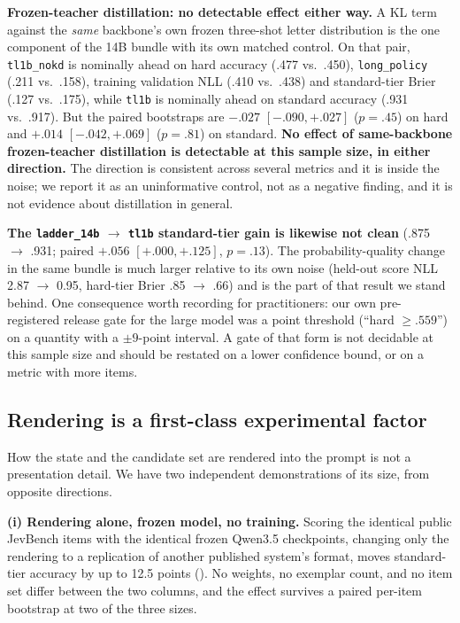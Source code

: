\textbf{Frozen-teacher distillation: no detectable effect either way.} A KL term against the
\emph{same} backbone's own frozen three-shot letter distribution is the one component of the 14B bundle
with its own matched control. On that pair, \texttt{tl1b\_nokd} is nominally ahead on hard accuracy
(.477 vs.\ .450), \texttt{long\_policy} (.211 vs.\ .158), training validation NLL (.410 vs.\ .438) and
standard-tier Brier (.127 vs.\ .175), while \texttt{tl1b} is nominally ahead on standard accuracy (.931
vs.\ .917). But the paired bootstraps are $-.027$ $[-.090, +.027]$ ($p{=}.45$) on hard and $+.014$
$[-.042, +.069]$ ($p{=}.81$) on standard. \textbf{No effect of same-backbone frozen-teacher
distillation is detectable at this sample size, in either direction.} The direction is consistent
across several metrics and it is inside the noise; we report it as an uninformative control, not as a
negative finding, and it is not evidence about distillation in general.

\textbf{The \texttt{ladder\_14b} $\to$ \texttt{tl1b} standard-tier gain is likewise not clean}
(.875 $\to$ .931; paired $+.056$ $[+.000, +.125]$, $p{=}.13$). The probability-quality change in the
same bundle is much larger relative to its own noise (held-out score NLL 2.87 $\to$ 0.95, hard-tier
Brier .85 $\to$ .66) and is the part of that result we stand behind. One consequence worth recording
for practitioners: our own pre-registered release gate for the large model was a point threshold
(``hard $\ge .559$'') on a quantity with a $\pm9$-point interval. A gate of that form is not decidable
at this sample size and should be restated on a lower confidence bound, or on a metric with more items.

\subsection{Rendering is a first-class experimental factor}
\label{sec:boundary:rendering}

How the state and the candidate set are rendered into the prompt is not a presentation detail. We have
two independent demonstrations of its size, from opposite directions.

\textbf{(i) Rendering alone, frozen model, no training.} Scoring the identical public JevBench items
with the identical frozen Qwen3.5 checkpoints, changing only the rendering to a replication of another
published system's format, moves standard-tier accuracy by up to 12.5 points
(). No weights, no exemplar count, and no item set differ between the two columns,
and the effect survives a paired per-item bootstrap at two of the three sizes.


